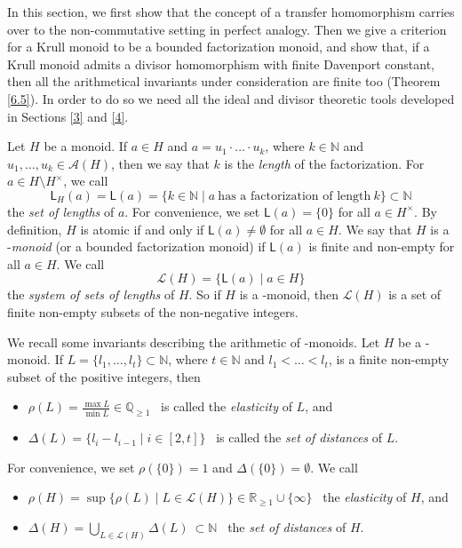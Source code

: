 \documentclass[a4paper]{amsart}
\theoremstyle{definition}
\numberwithin{equation}{section}
\begin{document}
In this section, we first show that the concept of a transfer
homomorphism carries over to the non-commutative setting in perfect
analogy. Then we give a criterion for  a Krull monoid to be a
bounded factorization monoid, and show that, if a Krull monoid
admits a divisor homomorphism with finite Davenport constant, then
all the arithmetical invariants under consideration are finite too
(Theorem \ref{6.5}). In order to do so we need all the ideal and
divisor theoretic tools developed in Sections \ref{3} and \ref{4}.

\smallskip
Let $H$ be a monoid. If $a \in H$ and $a = u_1 \cdot \ldots \cdot
u_k$, where $k \in \mathbb N$ and $u_1, \ldots, u_k \in \mathcal A
(H)$, then we say that $k$ is the {\it length} of the factorization.
For $a \in H \setminus H^{\times}$, we call
\[
\mathsf L_H (a) = \mathsf L (a) = \{ k \in \mathbb N \mid a \
\text{has a factorization of length} \ k \} \subset {\mathbb N}
\]
the {\it set of lengths} of $a$. For convenience, we set $\mathsf L
(a) = \{0\}$ for all $a \in H^{\times}$. By definition, $H$ is
atomic if and only if $\mathsf L (a) \ne \emptyset$ for all $a \in
H$. We say that $H$ is a {\text{\rm BF}}-{\it monoid} (or a bounded
factorization monoid) if $\mathsf L (a)$ is finite and non-empty for
all $a \in H$. We call
\[
\mathcal L (H) = \{ \mathsf L (a) \mid a \in H \}
\]
the {\it system of sets of lengths} of $H$. So if $H$ is a
{}-monoid, then $\mathcal L (H)$ is a set of finite non-empty
subsets of the non-negative integers.

We recall some invariants describing the arithmetic of {}-monoids.
Let $H$ be a {\text{\rm BF}}-monoid. If   $L = \{l_1, \ldots, l_t\} \subset
\mathbb N$, where $t \in \mathbb N$ and $l_1 < \ldots < l_t$, is a
finite non-empty subset of the positive integers,  then
\begin{itemize}
\smallskip
\item $\rho (L) = \frac{\max L}{\min L} \in \mathbb Q_{\ge 1}$ \ is
called the {\it elasticity} of $L$, and

\smallskip
\item $\Delta (L) = \{l_i - l_{i-1} \mid i \in [2, t] \}$ \ is called
the {\it set of distances} of $L$.
\end{itemize}
For convenience, we set $\rho ( \{0\}) = 1$ and $\Delta ( \{0\}) =
\emptyset$. We call
\begin{itemize}
\smallskip
\item $\rho (H) = \sup \{ \rho (L) \mid L \in \mathcal L (H) \} \in
      \mathbb R_{\ge 1} \cup \{\infty\}$ \ the {\it elasticity} of $H$, and

\smallskip
\item $\Delta (H) = \bigcup_{L \in \mathcal L (H)} \Delta (L) \
      \subset \mathbb N$ \ the {\it set of distances} of $H$.
\end{itemize}
\end{document}
